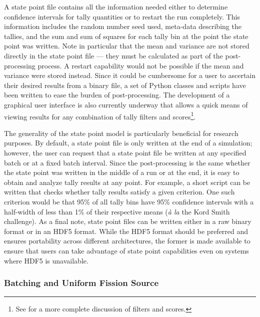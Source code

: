 \documentclass{ansconf}
\begin{document}
A state point file contains all the information needed either to determine
confidence intervals for tally quantities or to restart the run completely. This
information includes the random number seed used, meta-data describing the
tallies, and the sum and sum of squares for each tally bin at the point the
state point was written. Note in particular that the mean and variance are not
stored directly in the state point file --- they must be calculated as part of
the post-processing process. A restart capability would not be possible if the
mean and variance were stored instead. Since it could be cumbersome for a user
to ascertain their desired results from a binary file, a set of Python classes
and scripts have been written to ease the burden of post-processing. The
development of a graphical user interface is also currently underway that allows
a quick means of viewing results for any combination of tally filters and
scores\footnote{See \cite{ane-romano-2012} for a more complete discussion of
  filters and scores.}.

The generality of the state point model is particularly beneficial for research
purposes. By default, a state point file is only written at the end of a
simulation; however, the user can request that a state point file be written at
any specified batch or at a fixed batch interval. Since the post-processing is
the same whether the state point was written in the middle of a run or at the
end, it is easy to obtain and analyze tally results at any point. For example, a
short script can be written that checks whether tally results satisfy a given
criterion. One such criterion would be that 95\% of all tally bins have 95\%
confidence intervals with a half-width of less than 1\% of their respective
means (\emph{à la} the Kord Smith challenge). As a final note, state point files
can be written either in a raw binary format or in an HDF5 format. While the
HDF5 format should be preferred and ensures portability across different
architectures, the former is made available to ensure that users can take
advantage of state point capabilities even on systems where HDF5 is unavailable.

\subsubsection{Batching and Uniform Fission Source}
\end{document}
